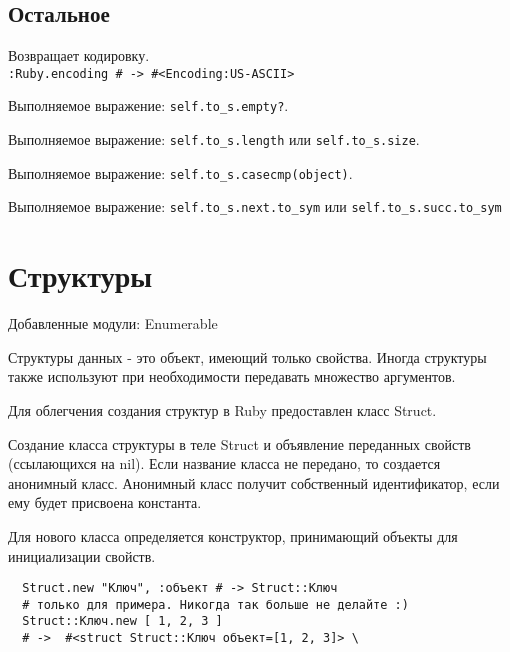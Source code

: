 \subsection*{Остальное}

\begin{methodlist}
  Возвращает кодировку.
  \\\verb!:Ruby.encoding # -> #<Encoding:US-ASCII>!

  Выполняемое выражение: \verb!self.to_s.empty?!.

  Выполняемое выражение: \verb!self.to_s.length! или \verb!self.to_s.size!.

  Выполняемое выражение: \verb!self.to_s.casecmp(object)!. 

  Выполняемое выражение: \verb!self.to_s.next.to_sym! или \verb!self.to_s.succ.to_sym!
\end{methodlist}

\section{Структуры}

Добавленные модули: Enumerable 

Структуры данных - это объект, имеющий только свойства. Иногда структуры также используют при необходимости передавать множество аргументов.

Для облегчения создания структур в Ruby предоставлен класс Struct.

\begin{methodlist}
  Создание класса структуры в теле Struct и объявление переданных свойств (ссылающихся на nil). Если название класса не передано, то создается анонимный класс. Анонимный класс получит собственный идентификатор, если ему будет присвоена константа.

  Для нового класса определяется конструктор, принимающий объекты для инициализации свойств.
  \begin{verbatim}
  Struct.new "Kлюч", :объект # -> Struct::Kлюч 
  # только для примера. Никогда так больше не делайте :) 
  Struct::Kлюч.new [ 1, 2, 3 ] 
  # ->  #<struct Struct::Kлюч объект=[1, 2, 3]> \
  \end{verbatim}
\end{methodlist}
  
